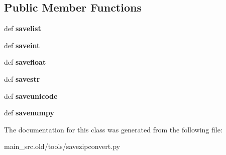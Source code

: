 \subsection*{Public Member Functions}
\begin{DoxyCompactItemize}
\item 
\hypertarget{classmain__src_8old_1_1tools_1_1savezipconvert_1_1SaveItems_ac965900f1265946a406590aefbd1feb9}{def {\bfseries savelist}}\label{classmain__src_8old_1_1tools_1_1savezipconvert_1_1SaveItems_ac965900f1265946a406590aefbd1feb9}

\item 
\hypertarget{classmain__src_8old_1_1tools_1_1savezipconvert_1_1SaveItems_a667d2b45fb65869ce707b30363ad949b}{def {\bfseries saveint}}\label{classmain__src_8old_1_1tools_1_1savezipconvert_1_1SaveItems_a667d2b45fb65869ce707b30363ad949b}

\item 
\hypertarget{classmain__src_8old_1_1tools_1_1savezipconvert_1_1SaveItems_aaea7197e10bf7d5dda08c54d8b8aa497}{def {\bfseries savefloat}}\label{classmain__src_8old_1_1tools_1_1savezipconvert_1_1SaveItems_aaea7197e10bf7d5dda08c54d8b8aa497}

\item 
\hypertarget{classmain__src_8old_1_1tools_1_1savezipconvert_1_1SaveItems_ab99782a0f51e1ce15ff3d56e76c6d7a4}{def {\bfseries savestr}}\label{classmain__src_8old_1_1tools_1_1savezipconvert_1_1SaveItems_ab99782a0f51e1ce15ff3d56e76c6d7a4}

\item 
\hypertarget{classmain__src_8old_1_1tools_1_1savezipconvert_1_1SaveItems_a9dff8f876d0f76723c4dee498af25bf6}{def {\bfseries saveunicode}}\label{classmain__src_8old_1_1tools_1_1savezipconvert_1_1SaveItems_a9dff8f876d0f76723c4dee498af25bf6}

\item 
\hypertarget{classmain__src_8old_1_1tools_1_1savezipconvert_1_1SaveItems_ad4cfe765da2904bfbb8aa94f7ef6b76e}{def {\bfseries savenumpy}}\label{classmain__src_8old_1_1tools_1_1savezipconvert_1_1SaveItems_ad4cfe765da2904bfbb8aa94f7ef6b76e}

\end{DoxyCompactItemize}


The documentation for this class was generated from the following file\-:\begin{DoxyCompactItemize}
\item 
main\-\_\-src.\-old/tools/savezipconvert.\-py\end{DoxyCompactItemize}
